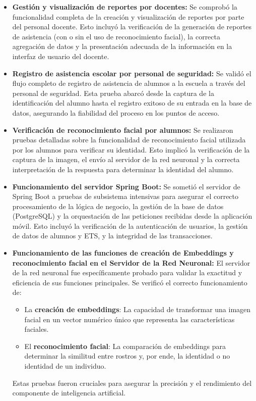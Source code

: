 \begin{itemize}
	\item \textbf{Gestión y visualización de reportes por docentes:} Se comprobó la funcionalidad completa de la creación y visualización de reportes por parte del personal docente. Esto incluyó la verificación de la generación de reportes de asistencia (con o sin el uso de reconocimiento facial), la correcta agregación de datos y la presentación adecuada de la información en la interfaz de usuario del docente.
	
	\item \textbf{Registro de asistencia escolar por personal de seguridad:} Se validó el flujo completo de registro de asistencia de alumnos a la escuela a través del personal de seguridad. Esta prueba abarcó desde la captura de la identificación del alumno hasta el registro exitoso de su entrada en la base de datos, asegurando la fiabilidad del proceso en los puntos de acceso.
	
	\item \textbf{Verificación de reconocimiento facial por alumnos:} Se realizaron pruebas detalladas sobre la funcionalidad de reconocimiento facial utilizada por los alumnos para verificar su identidad. Esto implicó la verificación de la captura de la imagen, el envío al servidor de la red neuronal y la correcta interpretación de la respuesta para determinar la identidad del alumno.
	
	\item \textbf{Funcionamiento del servidor Spring Boot:} Se sometió el servidor de Spring Boot a pruebas de subsistema intensivas para asegurar el correcto procesamiento de la lógica de negocio, la gestión de la base de datos (PostgreSQL) y la orquestación de las peticiones recibidas desde la aplicación móvil. Esto incluyó la verificación de la autenticación de usuarios, la gestión de datos de alumnos y ETS, y la integridad de las transacciones.
	
	\item \textbf{Funcionamiento de las funciones de creación de Embeddings y reconocimiento facial en el Servidor de la Red Neuronal:} El servidor de la red neuronal fue específicamente probado para validar la exactitud y eficiencia de sus funciones principales. Se verificó el correcto funcionamiento de:
	\begin{itemize}
		\item La \textbf{creación de embeddings}: La capacidad de transformar una imagen facial en un vector numérico único que representa las características faciales.
		\item El \textbf{reconocimiento facial}: La comparación de embeddings para determinar la similitud entre rostros y, por ende, la identidad o no identidad de un individuo.
	\end{itemize}
	Estas pruebas fueron cruciales para asegurar la precisión y el rendimiento del componente de inteligencia artificial.
\end{itemize}

